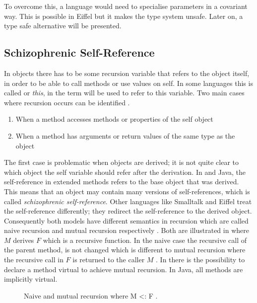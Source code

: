 To overcome this, a language would need to specialise parameters in a
covariant way. This is possible in Eiffel but it makes the type system
unsafe. Later on, a type safe alternative will be presented.

\subsection{Schizophrenic Self-Reference}
\label{sec:schizoReferences}
In objects there has to be some recursion variable that refers to the
object itself, in order to be able to call methods or use values on self. In some
languages this is called \self or \emph{this}, in \ooplss
the term \self will be used to refer to this variable. Two main cases where
recursion occurs can be identified \cite{simons_theory_2003-2}.

\begin{enumerate}
	\item When a method accesses methods or properties of the self object
	\item When a method has arguments or return values of the same type as the object
\end{enumerate}

The first case is problematic when objects are derived; it is not
quite clear to which object the self variable should refer after
the derivation. In \cpp and Java, the self-reference in extended
methods refers to the base object that was derived. This means that an
object may contain many versions of self-references, which is called
\emph{schizophrenic self-reference}. Other languages like Smalltalk
and Eiffel treat the self-reference differently; they redirect the
self-reference to the derived object. Consequently both models have
different semantics in recursion which are called naive recursion
and mutual recursion respectively \cite{cook_denotational_1989}. Both
are illustrated in  where $M$ derives $F$
which is a recursive function. In the naive case the recursive call
of the parent method, is not changed which is different to mutual
recursion where the recursive call in $F$ is returned to the caller $M$
\cite{simons_theory_2003-2}. In \cpp there is the possibility to declare
a method virtual to achieve mutual recursion. In Java, all methods are
implicitly virtual.

\begin{figure}[H]
	\centering
	\caption[Naive and mutual recursion where M <: F.]{Naive and mutual recursion where M <: F \cite{cook_denotational_1989}.}
	\label{fig:schizoRecursion}
\end{figure}

